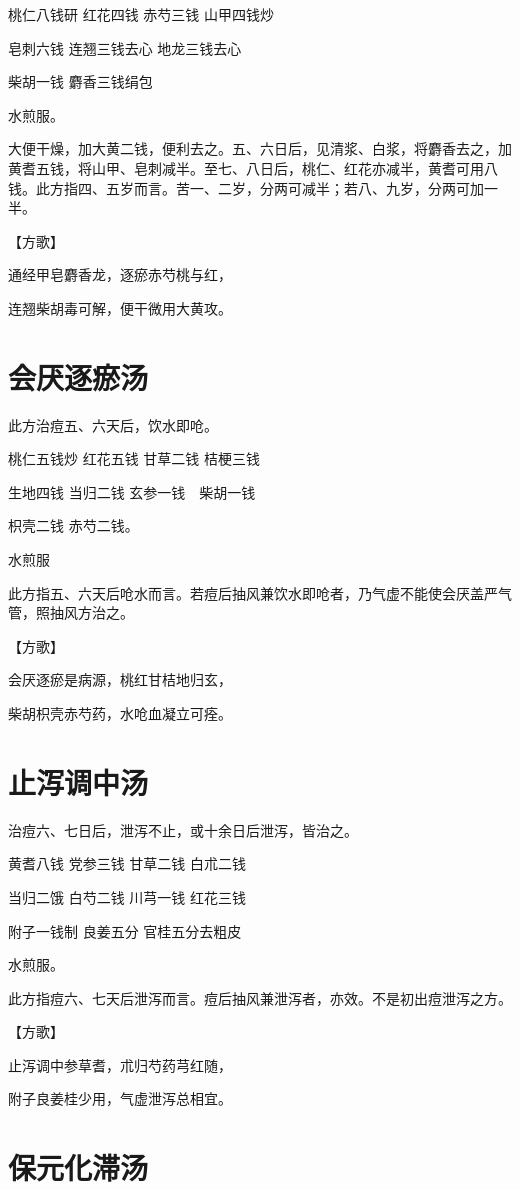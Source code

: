 \documentclass[a4paper,12pt,UTF8,twoside]{ctexbook}
\begin{document}
	桃仁八钱研 红花四钱 赤芍三钱 山甲四钱炒
	
	皂刺六钱 连翘三钱去心 地龙三钱去心
	
	柴胡一钱 麝香三钱绢包
	
	水煎服。
	
	大便干燥，加大黄二钱，便利去之。五、六日后，见清浆、白浆，将麝香去之，加黄耆五钱，将山甲、皂刺减半。至七、八日后，桃仁、红花亦减半，黄耆可用八钱。此方指四、五岁而言。苦一、二岁，分两可减半；若八、九岁，分两可加一半。
	
	【方歌】
	
	通经甲皂麝香龙，逐瘀赤芍桃与红，
	
	连翘柴胡毒可解，便干微用大黄攻。
	
	\section{会厌逐瘀汤}
	
	
	此方治痘五、六天后，饮水即呛。
	
	桃仁五钱炒 红花五钱 甘草二钱 桔梗三钱
	
	生地四钱 当归二钱 玄参一钱　柴胡一钱
	
	枳壳二钱 赤芍二钱。
	
	水煎服
	
	此方指五、六天后呛水而言。若痘后抽风兼饮水即呛者，乃气虚不能使会厌盖严气管，照抽风方治之。
	
	【方歌】
	
	会厌逐瘀是病源，桃红甘桔地归玄，
	
	柴胡枳壳赤芍药，水呛血凝立可痊。
	
	\section{止泻调中汤}
	
	
	治痘六、七日后，泄泻不止，或十余日后泄泻，皆治之。
	
	黄耆八钱 党参三钱 甘草二钱 白朮二钱
	
	当归二饿 白芍二钱 川芎一钱 红花三钱
	
	附子一钱制 良姜五分 官桂五分去粗皮
	
	水煎服。
	
	此方指痘六、七天后泄泻而言。痘后抽风兼泄泻者，亦效。不是初出痘泄泻之方。
	
	【方歌】
	
	止泻调中参草耆，朮归芍药芎红随，
	
	附子良姜桂少用，气虚泄泻总相宜。
	
	\section{保元化滞汤}
	
\end{document}
